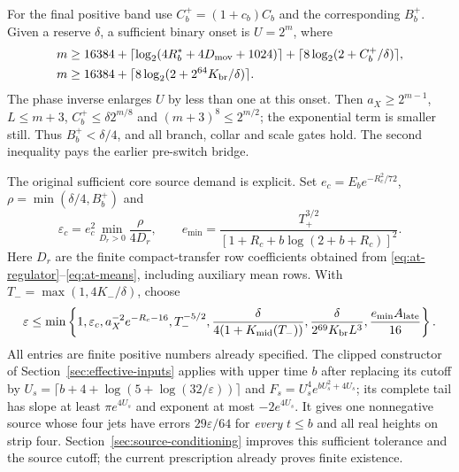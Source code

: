 For the final positive band use $C_b^+=(1+c_b)C_b$ and the corresponding
$B_b^+$. Given a reserve $\delta$, a sufficient binary onset is $U=2^m$,
where
\begin{align}
 m\ge{}&16384+\lceil\log_2(4R_b^*+4D_{\rm mov}+1024)\rceil
                   +\lceil8\log_2(2+C_b^+/\delta)\rceil,\notag\\
 m\ge{}&16384+\lceil8\log_2(2+2^{64}K_{\rm br}/\delta)\rceil.
 \label{eq:at-onset}
\end{align}
The phase inverse enlarges $U$ by less than one at this onset.
Then $a_X\ge2^{m-1}$, $L\le m+3$,
$C_b^+\le\delta2^{m/8}$ and $(m+3)^8\le2^{m/2}$;
the exponential term is smaller still. Thus $B_b^+<\delta/4$, and
all branch, collar and scale gates hold. The second inequality pays
the earlier pre-switch bridge.

The original sufficient core source demand is explicit. Set
$e_c=E_be^{-R_c^2/72}$, $\rho=\min(\delta/4,B_b^+)$ and
\[
 \varepsilon_c=e_c^2\min_{D_r>0}\frac{\rho}{4D_r},
 \qquad
 e_{\min}=\frac{T_+^{3/2}}{[1+R_c+b\log(2+b+R_c)]^2}.
\]
Here $D_r$ are the finite compact-transfer row coefficients obtained
from \eqref{eq:at-regulator}--\eqref{eq:at-means}, including auxiliary
mean rows. With $T_-=\max(1,4K_-/\delta)$, choose
\begin{equation}
 \varepsilon\le\min\left\{1,\varepsilon_c,
 a_X^{-2}e^{-R_c-16},T_-^{-5/2},
 \frac{\delta}{4(1+K_{\rm mid}(T_-))},
 \frac{\delta}{2^{69}K_{\rm br}L^3},
 \frac{e_{\min}A_{\rm late}}{16}\right\}.
 \label{eq:at-source-minimum}
\end{equation}
All entries are finite positive numbers already specified. The clipped
constructor of Section~\ref{sec:effective-inputs} applies with upper time
$b$ after replacing its cutoff by
$U_s=\lceil b+4+\log(5+\log(32/\varepsilon))\rceil$ and
$F_s=U_s^4e^{bU_s^2+4U_s}$; its complete tail has slope at least
$\pi e^{4U_s}$ and exponent at most $-2e^{4U_s}$.
It gives one nonnegative source whose four jets have errors
$29\varepsilon/64$ for \emph{every} $t\le b$ and all real heights
on strip four. Section~\ref{sec:source-conditioning} improves this
sufficient tolerance and the source cutoff; the current prescription
already proves finite existence.


